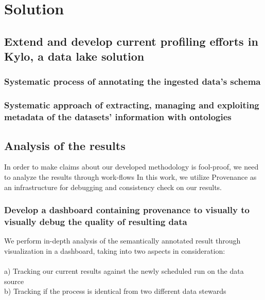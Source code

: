 %

\chapter{Solution}
\label{ownwork} 
\section{Extend and develop current profiling efforts in Kylo, a data lake solution}
\label{ownwork.bigdatalake}

\subsection{Systematic process of annotating the ingested data's schema\cite{bernstein2011generic}}
\label{ownwork.nifi}
\subsection{Systematic approach of extracting, managing and exploiting metadata of the datasets' information with  ontologies
}
 \section{Analysis of the results}
 In order to make claims about our developed methodology is fool-proof, we need to analyze the results through work-flows In this work, we utilize Provenance as an infrastructure for debugging and consistency check on our results.
\subsection{Develop a dashboard containing provenance to visually to visually debug the quality of resulting data}
We perform in-depth analysis of the semantically annotated result through visualization in a dashboard, taking into two aspects in consideration: \\~\\
a) Tracking our current results against the newly scheduled run on the data source \\
b) Tracking if the process is identical from two different data stewards

\label{ownwork.standardization}

